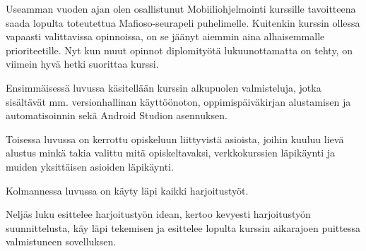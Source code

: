 Useamman vuoden ajan olen osallistunut Mobiiliohjelmointi kurssille tavoitteena
saada lopulta toteutettua Mafioso-seurapeli puhelimelle. Kuitenkin kurssin
ollessa vapaasti valittavissa opinnoissa, on se jäänyt aiemmin aina
alhaisemmalle prioriteetille. Nyt kun muut opinnot diplomityötä lukuunottamatta
on tehty, on viimein hyvä hetki suorittaa kurssi.

Ensimmäisessä luvussa käsitellään kurssin alkupuolen valmisteluja, jotka
sisältävät mm. versionhallinan käyttöönoton, oppimispäiväkirjan alustamisen ja
automatisoinnin sekä Android Studion asennuksen.

Toisessa luvussa on kerrottu opiskeluun liittyvistä asioista, joihin kuuluu
lievä alustus minkä takia valittu mitä opiskeltavaksi, verkkokurssien
läpikäynti ja muiden yksittäisen asioiden läpikäynti.

Kolmannessa luvussa on käyty läpi kaikki harjoitustyöt.

Neljäs luku esittelee harjoitustyön idean, kertoo kevyesti harjoitustyön
suunnittelusta, käy läpi tekemisen ja esittelee lopulta kurssin aikarajoen
puittessa valmistuneen sovelluksen.
